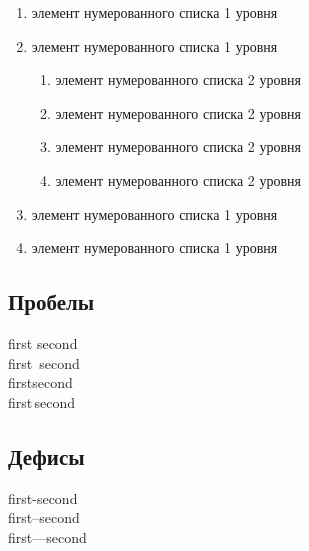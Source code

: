 \begin{enumerate}
    \item элемент нумерованного списка 1 уровня
    \item элемент нумерованного списка 1 уровня
        \begin{enumerate}
        \item элемент нумерованного списка 2 уровня
        \item элемент нумерованного списка 2 уровня
        \item элемент нумерованного списка 2 уровня
        \item элемент нумерованного списка 2 уровня
    \end{enumerate}
    \item элемент нумерованного списка 1 уровня
    \item элемент нумерованного списка 1 уровня
\end{enumerate}

\subsection{Пробелы}

\noindent
first second\\
first~second\\ %
first\:second\\
first\,second\\
\subsection{Дефисы}

\noindent
first-second\\
first--second\\
first---second
